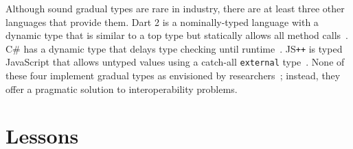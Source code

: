 \documentclass[english,cleveref,crc]{programming}
\newcommand{\JSPP}{JS\code{++}}
\newcommand{\code}[1]{\texttt{#1}}
\begin{document}
Although sound gradual types are rare in industry, there are at
least three other languages that provide them.
Dart 2 is a nominally-typed language with a dynamic type that is similar
to a top type but statically allows all method calls~\cite{dart-types}.
C\# has a dynamic type that delays type checking until runtime~\cite{bmt-ecoop-2010}.
\JSPP{} is typed JavaScript that allows untyped values
using a catch-all \code{external} type~\cite{jspp}.
None of these four implement gradual types as envisioned by researchers~\cite{svcb-snapl-2015,tfffgksst-snapl-2017,g-snapl-2019};
instead, they offer a pragmatic solution to interoperability problems.




\section{Lessons}
\label{s:conclusion}
\end{document}
